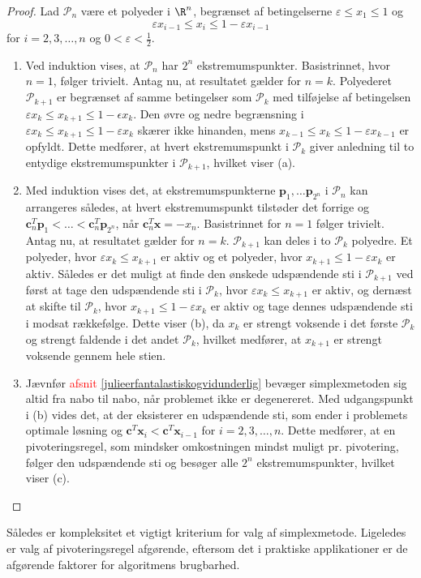 \begin{proof}
%
Lad $\mathcal{P}_n$ være et polyeder i $\R^n$, begrænset af betingelserne $\varepsilon \leq x_1 \leq 1$ og $$\varepsilon x_{i-1} \leq x_i \leq 1 - \varepsilon x_{i-1}$$ for $i = 2, 3, \ldots, n$ og $0 < \varepsilon < \frac{1}{2}$.
%
\begin{enumerate}[label = (\alph*)]
\item Ved induktion vises, at $\mathcal{P}_n$ har $2^n$ ekstremumspunkter. 
Basistrinnet, hvor $n=1$, følger trivielt.
Antag nu, at resultatet gælder for $n=k$.
Polyederet $\mathcal{P}_{k+1}$ er begrænset af samme betingelser som $\mathcal{P}_{k}$ med tilføjelse af betingelsen $\varepsilon x_{k} \leq x_{k+1} \leq 1 - \epsilon x_{k}$.
Den øvre og nedre begrænsning i $\varepsilon x_{k} \leq x_{k+1} \leq 1 - \varepsilon x_{k}$ skærer ikke hinanden, mens $ x_{k-1} \leq x_k \leq 1 - \varepsilon x_{k-1}$ er opfyldt.
Dette medfører, at hvert ekstremumspunkt i $\mathcal{P}_{k}$ giver anledning til to entydige ekstremumspunkter i $\mathcal{P}_{k+1}$, hvilket viser (a).
%
%
\item Med induktion vises det, at ekstremumspunkterne $\textbf{p}_1, \ldots \textbf{p}_{2^n}$ i $\mathcal{P}_n$ kan arrangeres således, at hvert ekstremumspunkt tilstøder det forrige og $\textbf{c}_n^T  \textbf{p}_1 < \ldots < \textbf{c}_n^T  \textbf{p}_{2^n}$, når $\textbf{c}_n^T \textbf{x} = -x_n$.
Basistrinnet for $n=1$ følger trivielt.
Antag nu, at resultatet gælder for  $n = k$.
$\mathcal{P}_{k+1}$ kan deles i to $\mathcal{P}_{k}$ polyedre.
Et polyeder, hvor $\varepsilon x_{k} \leq x_{k+1}$ er aktiv og et polyeder, hvor $x_{k+1} \leq 1 - \varepsilon x_{k}$ er aktiv.
Således er det muligt at finde den ønskede udspændende sti i $\mathcal{P}_{k+1}$ ved først at tage den udspændende sti i $\mathcal{P}_{k}$, hvor $\varepsilon x_{k} \leq x_{k+1}$ er aktiv, og dernæst at skifte til $\mathcal{P}_{k}$, hvor $x_{k+1} \leq 1 - \varepsilon x_{k}$ er aktiv og tage dennes udspændende sti i modsat rækkefølge.
Dette viser (b), da $x_k$ er strengt voksende i det første $\mathcal{P}_{k}$ og strengt faldende i det andet $\mathcal{P}_{k}$, hvilket medfører, at $x_{k+1}$ er strengt voksende gennem hele stien.
%
\item Jævnfør \textcolor{red}{afsnit \ref{julieerfantalastiskogvidunderlig}} bevæger simplexmetoden sig altid fra nabo til nabo, når problemet ikke er degenereret.
Med udgangspunkt i (b) vides det, at der eksisterer en udspændende sti, som ender i problemets optimale løsning og $\textbf{c}^T\textbf{x}_i < \textbf{c}^T\textbf{x}_{i-1}$ for $i = 2, 3, \ldots ,n$.
Dette medfører, at en pivoteringsregel, som mindsker omkostningen mindst muligt pr. pivotering, følger den udspændende sti og besøger alle $2^n$ ekstremumspunkter, hvilket viser (c).
\end{enumerate}
\end{proof}
%
Således er kompleksitet et vigtigt kriterium for valg af simplexmetode.
Ligeledes er valg af pivoteringsregel afgørende, eftersom det i praktiske applikationer er de afgørende faktorer for algoritmens brugbarhed.

